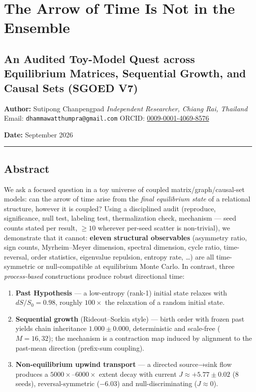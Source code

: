 \section{The Arrow of Time Is Not in the
Ensemble}\label{the-arrow-of-time-is-not-in-the-ensemble}

\subsection{An Audited Toy-Model Quest across Equilibrium Matrices,
Sequential Growth, and Causal Sets (SGOED
V7)}\label{an-audited-toy-model-quest-across-equilibrium-matrices-sequential-growth-and-causal-sets-sgoed-v7}

\textbf{Author:} Sutipong Chanpengpad \emph{Independent Researcher,
Chiang Rai, Thailand} Email: \texttt{dhammawatthumpra@gmail.com} ORCID:
\href{https://orcid.org/0009-0001-4069-8576}{0009-0001-4069-8576}

\textbf{Date:} September 2026

\begin{center}\rule{0.5\linewidth}{0.5pt}\end{center}

\subsection{Abstract}\label{abstract}

We ask a focused question in a toy universe of coupled
matrix/graph/causal-set models: can the arrow of time arise from the
\emph{final equilibrium state} of a relational structure, however it is
coupled? Using a disciplined audit (reproduce, significance, null test,
labeling test, thermalization check, mechanism --- seed counts stated
per result, \(\ge 10\) wherever per-seed scatter is non-trivial), we
demonstrate that it cannot: \textbf{eleven structural observables}
(asymmetry ratio, sign counts, Myrheim--Meyer dimension, spectral
dimension, cycle ratio, time-reversal, order statistics, eigenvalue
repulsion, entropy rate, \ldots) are all time-symmetric or
null-compatible at equilibrium Monte Carlo. In contrast, three
\emph{process-based} constructions produce robust directional time:

\begin{enumerate}
\def\labelenumi{\arabic{enumi}.}
\tightlist
\item
  \textbf{Past Hypothesis} --- a low-entropy (rank-1) initial state
  relaxes with \(dS/S_0 = 0.98\), roughly \(100\times\) the relaxation
  of a random initial state.
\item
  \textbf{Sequential growth} (Rideout--Sorkin style) --- birth order
  with frozen past yields chain inheritance \(1.000\pm0.000\),
  deterministic and scale-free (\(M=16,32\)); the mechanism is a
  contraction map induced by alignment to the past-mean direction
  (prefix-sum coupling).
\item
  \textbf{Non-equilibrium upwind transport} --- a directed source→sink
  flow produces a \(5000\times\)--\(6000\times\) extent decay with
  current \(J\approx +5.77\pm0.02\) (8 seeds), reversal-symmetric
  (\(-6.03\)) and null-discriminating (\(J\approx 0\)).
\end{enumerate}

